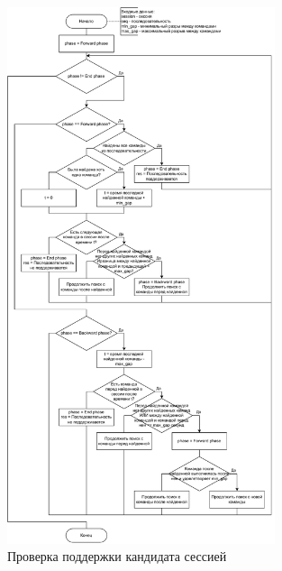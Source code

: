 \begin{figure}[h!]
	\centering
	\includegraphics[width=0.7\textwidth]{inc/img/sessionSupportsSequence.drawio.pdf}
	\caption{Проверка поддержки кандидата сессией}
	\label{sessionSupportsSequence.drawio}
\end{figure}